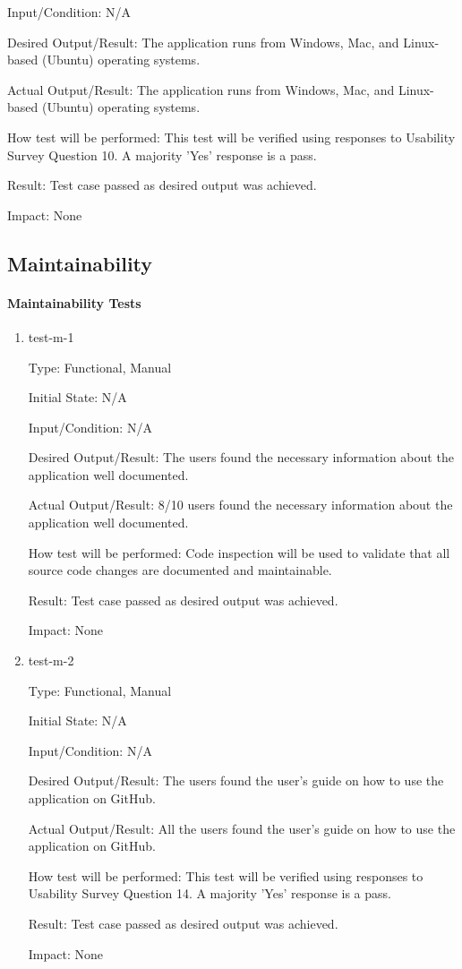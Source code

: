 \documentclass[12pt, titlepage]{article}
\begin{document}
\begin{enumerate}
Input/Condition: N/A		

Desired Output/Result: The application runs from Windows, Mac, and Linux-based (Ubuntu) operating systems.	

Actual Output/Result: The application runs from Windows, Mac, and Linux-based (Ubuntu) operating systems.

How test will be performed: This test will be verified using responses to Usability Survey Question 10. A majority 'Yes' response is a pass.

Result: Test case passed as desired output was achieved.

Impact: None

\end{enumerate}

\subsection{Maintainability}

\paragraph{Maintainability Tests}

\begin{enumerate}

\item{test-m-1\\}

Type: Functional, Manual		

Initial State: N/A	

Input/Condition: N/A		

Desired Output/Result: The users found the necessary information about the application well documented. 

Actual Output/Result: 8/10 users found the necessary information about the application well documented.

How test will be performed: Code inspection will be used to validate that all source code changes are documented and maintainable. 

Result: Test case passed as desired output was achieved.

Impact: None

\item{test-m-2\\}

Type: Functional, Manual

Initial State: N/A

Input/Condition: N/A

Desired Output/Result:  The users found the user's guide on how to use the application on GitHub.

Actual Output/Result: All the users found the user's guide on how to use the application on GitHub.

How test will be performed: This test will be verified using responses to Usability Survey Question 14. A majority 'Yes' response is a pass.

Result: Test case passed as desired output was achieved.

Impact: None

\end{enumerate}
\end{document}
